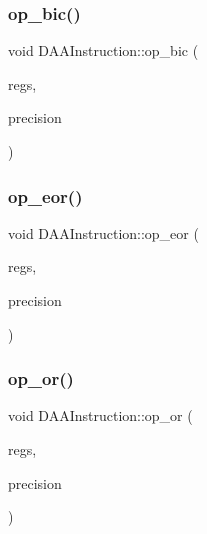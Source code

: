 \mbox{\label{classDAAInstruction_a3ae2804abee589621799869c38895cf7}} 
\subsubsection{\texorpdfstring{op\+\_\+bic()}{op\_bic()}}
{\footnotesize\ttfamily void D\+A\+A\+Instruction\+::op\+\_\+bic (\begin{DoxyParamCaption}\item[{\hyperlink{DAAInstruction_8h_af0fae93a861de9cf37988d5673cac523}{reg\+Table} \&}]{regs,  }\item[{\hyperlink{DAAInstruction_8h_a0e8cae02815a5f8adc750122d790b455}{reg\+Precision\+Table} \&}]{precision }\end{DoxyParamCaption})}

\mbox{\label{classDAAInstruction_a71983578f511b37f053de641a06f8ae4}} 
\subsubsection{\texorpdfstring{op\+\_\+eor()}{op\_eor()}}
{\footnotesize\ttfamily void D\+A\+A\+Instruction\+::op\+\_\+eor (\begin{DoxyParamCaption}\item[{\hyperlink{DAAInstruction_8h_af0fae93a861de9cf37988d5673cac523}{reg\+Table} \&}]{regs,  }\item[{\hyperlink{DAAInstruction_8h_a0e8cae02815a5f8adc750122d790b455}{reg\+Precision\+Table} \&}]{precision }\end{DoxyParamCaption})}

\mbox{\label{classDAAInstruction_a80e4ca4fa44a2eeb2531f5084e0cab3e}} 
\subsubsection{\texorpdfstring{op\+\_\+or()}{op\_or()}}
{\footnotesize\ttfamily void D\+A\+A\+Instruction\+::op\+\_\+or (\begin{DoxyParamCaption}\item[{\hyperlink{DAAInstruction_8h_af0fae93a861de9cf37988d5673cac523}{reg\+Table} \&}]{regs,  }\item[{\hyperlink{DAAInstruction_8h_a0e8cae02815a5f8adc750122d790b455}{reg\+Precision\+Table} \&}]{precision }\end{DoxyParamCaption})}

